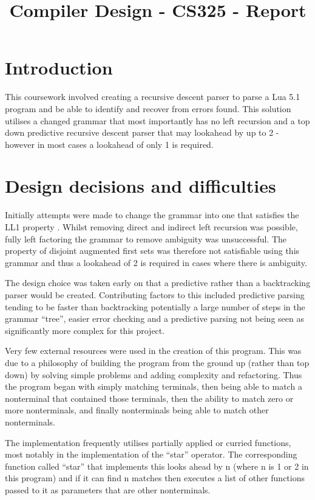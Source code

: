 \documentclass[11pt]{article}
\title{\vspace{-1.7cm}\TitleFont Compiler Design - CS325 - Report}
\date{\vspace{-2.0cm}}
\begin{document}
\maketitle

\thispagestyle{fancy}

\section*{Introduction}

    This coursework involved creating a recursive descent parser to parse a Lua 5.1 program and be able to identify and recover from errors found. This solution utilises a changed grammar that most importantly has no left recursion and a top down predictive recursive descent parser that may lookahead by up to 2 - however in most cases a lookahead of only 1 is required.

\section*{Design decisions and difficulties}

    Initially attempts were made to change the grammar into one that satisfies the LL1 property \cite{ll1}. Whilst removing direct and indirect left recursion was possible, fully left factoring the grammar to remove ambiguity was unsuccessful. The property of disjoint augmented first sets was therefore not satisfiable using this grammar and thus a lookahead of 2 is required in cases where there is ambiguity.

    The design choice was taken early on that a predictive rather than a backtracking parser would be created. Contributing factors to this included predictive parsing tending to be faster than backtracking potentially a large number of steps in the grammar ``tree'', easier error checking and a predictive parsing not being seen as significantly more complex for this project.

    Very few external resources were used in the creation of this program. This was due to a philosophy of building the program from the ground up (rather than top down) by solving simple problems and adding complexity and refactoring. Thus the program began with simply matching terminals, then being able to match a nonterminal that contained those terminals, then the ability to match zero or more nonterminals, and finally nonterminals being able to match other nonterminals.

    The implementation frequently utilises partially applied or curried functions, most notably in the implementation of the ``star'' operator. The corresponding function called ``star'' that implements this looks ahead by n (where n is 1 or 2 in this program) and if it can find n matches then executes a list of other functions passed to it as parameters that are other nonterminals.
\end{document}
